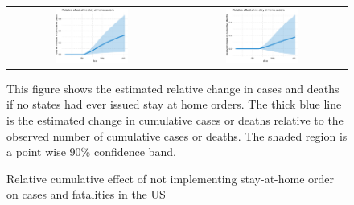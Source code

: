 \documentclass[3p, longtitle]{elsarticle}
\theoremstyle{definition}
\begin{document}
\begin{figure}[ht]
  \caption{Relative cumulative effect  of  not implementing stay-at-home order on cases and fatalities in the US  \label{fig:US-shelter-dgrowth}}
  \begin{minipage}{\linewidth}
    \centering
    \begin{tabular}{cc}
         \includegraphics[width=0.45\textwidth]{tables_and_figures/us-shelter-rcumu_idx}
      &
        \includegraphics[width=0.45\textwidth]{tables_and_figures/us-shelter-rcumu_deaths_idx}
    \end{tabular}
    \begin{flushleft}
      \footnotesize This figure shows the estimated relative change in
      cases and deaths if no states had ever issued stay at home
      orders. The thick blue line is the estimated change in cumulative
      cases or deaths relative to the observed number of cumulative cases
      or deaths. The shaded region is a point wise 90\% confidence
      band.
    \end{flushleft}
  \end{minipage}
\end{figure}




\end{document}
